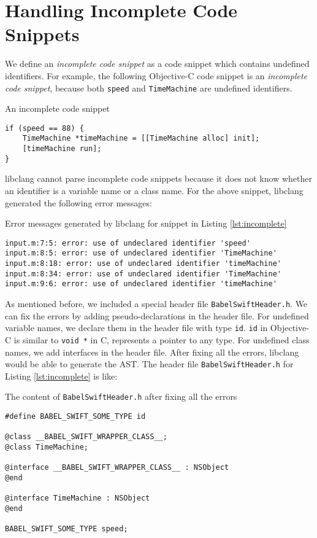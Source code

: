 \documentclass{sfuthesis}
\begin{document}
\section{Handling Incomplete Code Snippets}

We define an \emph{incomplete code snippet} as a code snippet which contains undefined identifiers. For example, the following Objective-C code snippet is an \emph{incomplete code snippet}, because both \texttt{speed} and \texttt{TimeMachine} are undefined identifiers.

\begin{listing}
\caption{An incomplete code snippet}
\label{lst:incomplete}
\begin{verbatim}
if (speed == 88) {
    TimeMachine *timeMachine = [[TimeMachine alloc] init];
    [timeMachine run];
}
\end{verbatim}
\end{listing}

libclang cannot parse incomplete code snippets because it does not know whether an identifier is a variable name or a class name. For the above snippet, libclang generated the following error messages:

\begin{listing}
\caption{Error messages generated by libclang for snippet in Listing \ref{lst:incomplete}}
\begin{verbatim}
input.m:7:5: error: use of undeclared identifier 'speed'
input.m:8:5: error: use of undeclared identifier 'TimeMachine'
input.m:8:18: error: use of undeclared identifier 'timeMachine'
input.m:8:34: error: use of undeclared identifier 'TimeMachine'
input.m:9:6: error: use of undeclared identifier 'timeMachine'
\end{verbatim}
\end{listing}

As mentioned before, we included a special header file \texttt{BabelSwiftHeader.h}. We can fix the errors by adding pseudo-declarations in the header file. For undefined variable names, we declare them in the header file with type \texttt{id}. \texttt{id} in Objective-C is similar to \texttt{void *} in C, represents a pointer to any type. For undefined class names, we add interfaces in the header file. After fixing all the errors, libclang would be able to generate the AST. The header file \texttt{BabelSwiftHeader.h} for Listing \ref{lst:incomplete} is like:

\begin{listing}
\caption{The content of \texttt{BabelSwiftHeader.h} after fixing all the errors}
\begin{verbatim}
#define BABEL_SWIFT_SOME_TYPE id

@class __BABEL_SWIFT_WRAPPER_CLASS__;
@class TimeMachine;

@interface __BABEL_SWIFT_WRAPPER_CLASS__ : NSObject
@end

@interface TimeMachine : NSObject
@end

BABEL_SWIFT_SOME_TYPE speed;
\end{verbatim}
\end{listing}
\end{document}
